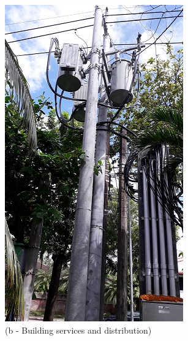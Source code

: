 \begin{figure}
\begin{minipage}[b]{0.22\linewidth}
		\includegraphics[width=\textwidth]{figures/R1P_visual/buildingservicedistribution}
		\caption*{(b - Building services and distribution)}


\end{minipage}
\end{figure}
